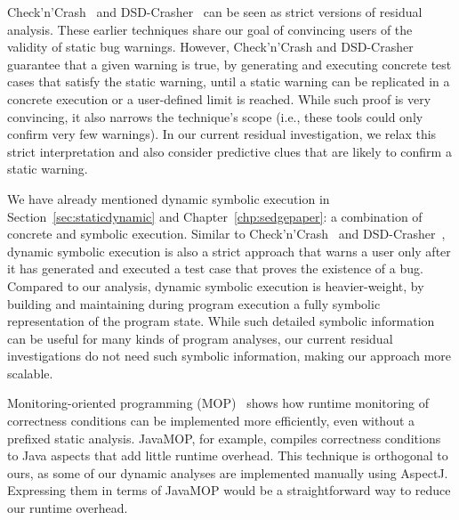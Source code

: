 Check'n'Crash~\cite{csallner05check} and DSD-Crasher~\cite{csallner06dsd-crasher,smaragdakis07combining} can be seen as strict versions of residual analysis. These earlier techniques share our goal of convincing users of the validity of static bug warnings. However, Check'n'Crash and DSD-Crasher guarantee that a given warning is true, by generating and executing concrete test cases that satisfy the static warning, until a static warning can be replicated in a concrete execution or a user-defined limit is reached. While such proof is very convincing, it also narrows the technique's scope (i.e., these tools could only confirm very few warnings). In our current residual investigation, we relax this strict interpretation and also consider predictive clues that are likely to confirm a static warning.

We have already mentioned dynamic symbolic execution in Section~\ref{sec:staticdynamic} and Chapter~\ref{chp:sedgepaper}: a combination of concrete and symbolic execution. Similar to Check'n'Crash~\cite{csallner05check} and DSD-Crasher~\cite{csallner06dsd-crasher,smaragdakis07combining}, dynamic symbolic execution is also a strict approach that warns a user only after it has generated and executed a test case that proves the
existence of a bug. Compared to our analysis, dynamic symbolic
execution is heavier-weight, by building and maintaining
during program execution a fully symbolic representation of the
program state. While such detailed symbolic information can be useful
for many kinds of program analyses, our current residual
investigations do not need such symbolic information, making our
approach more scalable.

Monitoring-oriented programming (MOP)~\cite{chen07mop} shows how
runtime monitoring of correctness conditions can be implemented more
efficiently, even without a prefixed static analysis. JavaMOP, for
example, compiles correctness conditions to Java aspects that add
little runtime overhead. This technique is orthogonal to ours,
as some of our dynamic analyses are implemented manually
using AspectJ. Expressing them in terms of JavaMOP would be a
straightforward way to reduce our runtime overhead.

